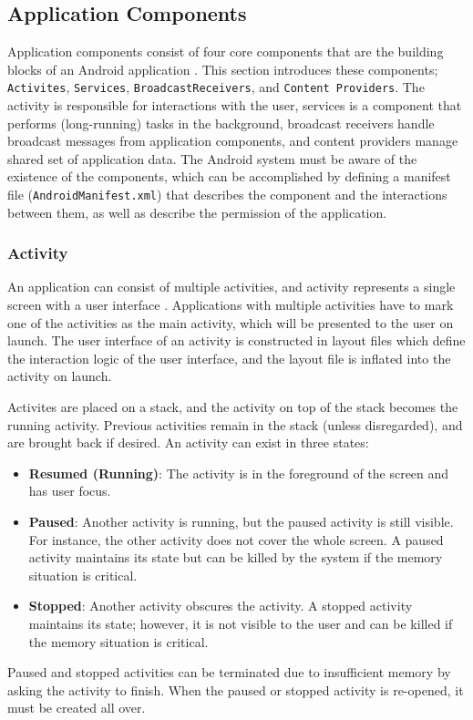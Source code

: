 \subsection{Application Components}
Application components consist of four core components that are the building blocks of an Android application \cite{appfundamentals}. This section introduces these components; \verb|Activites|, \verb|Services|, \verb|BroadcastReceivers|, and \verb|Content Providers|. The activity is responsible for interactions with the user, services is a component that performs (long-running) tasks in the background, broadcast receivers handle broadcast messages from application components, and content providers manage shared set of application data. The Android system must be aware of the existence of the components, which can be accomplished by defining a manifest file (\verb|AndroidManifest.xml|) that describes the component and the interactions between them, as well as describe the permission of the application. 


\subsubsection{Activity}
An application can consist of multiple activities, and activity represents a single screen with a user interface \cite{activities}. Applications with multiple activities have to mark one of the activities as the main activity, which will be presented to the user on launch. The user interface of an activity is constructed in layout files which define the interaction logic of the user interface, and the layout file is inflated into the activity on launch. 

Activites are placed on a stack, and the activity on top of the stack becomes the running activity. Previous activities remain in the stack (unless disregarded), and are brought back if desired.  An activity can exist in three states:

\begin{itemize}
    \item \textbf{Resumed (Running)}: The activity is in the foreground of the screen and has user focus. 
    \item \textbf{Paused}: Another activity is running, but the paused activity is still visible. For instance, the other activity does not cover the whole screen. A paused activity maintains its state but can be killed by the system if the memory situation is critical.  
    \item \textbf{Stopped}: Another activity obscures the activity. A stopped activity maintains its state; however, it is not visible to the user and can be killed if the memory situation is critical.
\end{itemize}
Paused and stopped activities can be terminated due to insufficient memory by asking the activity to finish. When the paused or stopped activity is re-opened, it must be created all over. 

